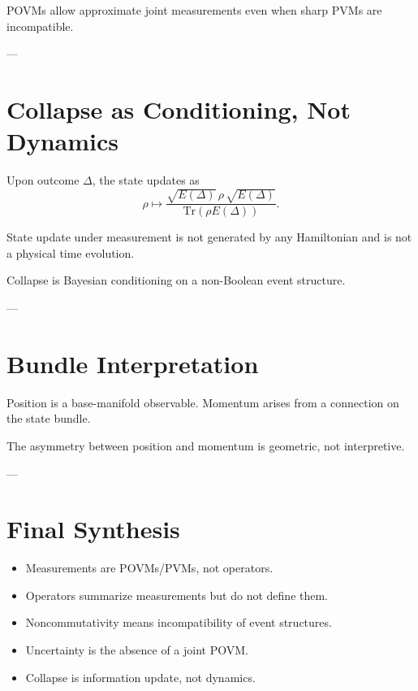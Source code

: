 \documentclass[11pt]{article}
\begin{document}
\begin{proposition}
POVMs allow approximate joint measurements even when sharp PVMs are
incompatible.
\end{proposition}

---

\section{Collapse as Conditioning, Not Dynamics}

\begin{axiom}
Upon outcome $\Delta$, the state updates as
\[
\rho \mapsto
\frac{\sqrt{E(\Delta)}\,\rho\,\sqrt{E(\Delta)}}
{\mathrm{Tr}(\rho E(\Delta))}.
\]
\end{axiom}

\begin{theorem}
State update under measurement is not generated by any Hamiltonian and is
not a physical time evolution.
\end{theorem}

\begin{corollary}
Collapse is Bayesian conditioning on a non-Boolean event structure.
\end{corollary}

---

\section{Bundle Interpretation}

\begin{proposition}
Position is a base-manifold observable.
Momentum arises from a connection on the state bundle.
\end{proposition}

\begin{corollary}
The asymmetry between position and momentum is geometric, not interpretive.
\end{corollary}

---

\section{Final Synthesis}

\begin{itemize}
\item Measurements are POVMs/PVMs, not operators.
\item Operators summarize measurements but do not define them.
\item Noncommutativity means incompatibility of event structures.
\item Uncertainty is the absence of a joint POVM.
\item Collapse is information update, not dynamics.
\end{itemize}

\begin{center}
\end{center}
\end{document}
